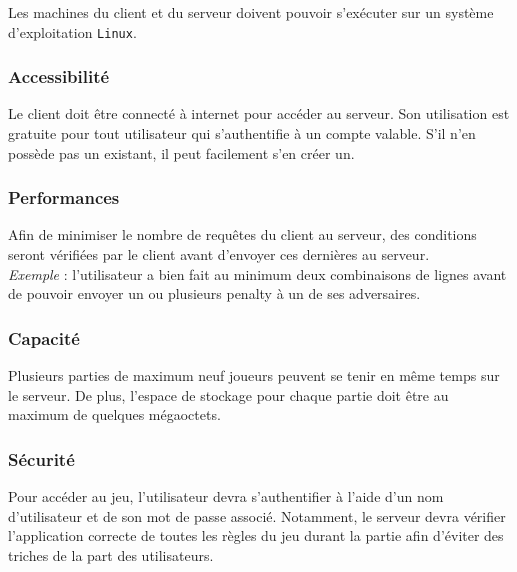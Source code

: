 \documentclass{article}
\begin{document}
Les machines du client et du serveur doivent pouvoir s'exécuter sur un système d'exploitation \texttt{Linux}.

\subsubsection{Accessibilité}

Le client doit être connecté à internet pour accéder au serveur. Son utilisation est gratuite pour tout utilisateur qui s'authentifie à un compte valable. S'il n'en possède pas un existant, il peut facilement s'en créer un. 

\subsubsection{Performances}


Afin de minimiser le nombre de requêtes du client au serveur, des conditions seront vérifiées par le client avant d'envoyer ces dernières au serveur. \\

\textit{Exemple} : l'utilisateur a bien fait au minimum deux combinaisons de lignes avant de pouvoir envoyer un ou plusieurs penalty à un de ses adversaires.

\subsubsection{Capacité}


Plusieurs parties de maximum neuf joueurs peuvent se tenir en même temps sur le serveur. De plus, l'espace de stockage pour chaque partie doit être au maximum de quelques mégaoctets.

\subsubsection{Sécurité}


Pour accéder au jeu, l'utilisateur devra s'authentifier à l'aide d'un nom d'utilisateur et de son mot de passe associé. Notamment, le serveur devra vérifier l'application correcte de toutes les règles du jeu durant la partie afin d'éviter des triches de la part des utilisateurs.
\end{document}
